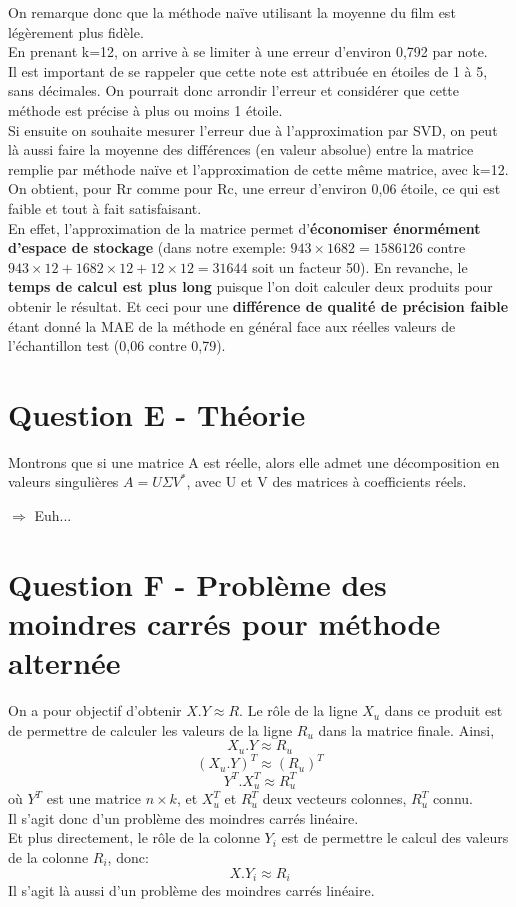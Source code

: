 \documentclass[12pt,a4paper]{article}
\begin{document}
On remarque donc que la méthode naïve utilisant la moyenne du film est légèrement plus fidèle.\\
En prenant k=12, on arrive à se limiter à une erreur d'environ 0,792 par note.\\
Il est important de se rappeler que cette note est attribuée en étoiles de 1 à 5, sans décimales. On pourrait donc arrondir l'erreur et considérer que cette méthode est précise à plus ou moins 1 étoile.\\

Si ensuite on souhaite mesurer l'erreur due à l'approximation par SVD, on peut là aussi faire la moyenne des différences (en valeur absolue) entre la matrice remplie par méthode naïve et l'approximation de cette même matrice, avec k=12.\\
On obtient, pour Rr comme pour Rc, une erreur d'environ 0,06 étoile, ce qui est faible et tout à fait satisfaisant.\\

En effet, l'approximation de la matrice permet d'\textbf{économiser énormément d'espace de stockage} (dans notre exemple: $943\times1682=1586126$ contre $943\times12+1682\times12+12\times12=31644$ soit un facteur 50). En revanche, le \textbf{temps de calcul est plus long} puisque l'on doit calculer deux produits pour obtenir le résultat. Et ceci pour une \textbf{différence de qualité de précision faible} étant donné la MAE de la méthode en général face aux réelles valeurs de l'échantillon test (0,06 contre 0,79).

\section{Question E - Théorie}
Montrons que si une matrice A est réelle, alors elle admet une décomposition en valeurs singulières $A=U \Sigma V^{*}$, avec U et V des matrices à coefficients réels.

$\Rightarrow$ Euh...

\section{Question F - Problème des moindres carrés pour méthode alternée}
On a pour objectif d'obtenir $X.Y\approx R$. Le rôle de la ligne $X_u$ dans ce produit est de permettre de calculer les valeurs de la ligne $R_u$ dans la matrice finale. Ainsi, 
$$X_u.Y\approx R_u$$
$$(X_u.Y)^T\approx (R_u)^T$$
$$Y^T.X_u^T\approx R_u^T$$
où $Y^T$ est une matrice $n\times k$, et $X_u^T$ et $R_u^T$ deux vecteurs colonnes, $R_u^T$ connu. \\
Il s'agit donc d'un problème des moindres carrés linéaire.\\

Et plus directement, le rôle de la colonne $Y_i$ est de permettre le calcul des valeurs de la colonne $R_i$, donc:
$$X.Y_i \approx R_i$$
Il s'agit là aussi d'un problème des moindres carrés linéaire.
\end{document}
